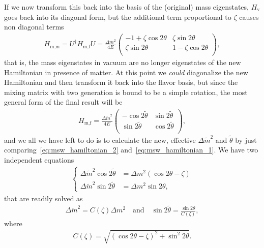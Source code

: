 If we now transform this back into the basis of the (original) mass eigenstates,
$H_\text{v}$ goes back into its diagonal form, but the additional term proportional
to $\zeta$ causes non diagonal terms
\begin{align*}
  H_\text{m,m} = U^\dag H_\text{m,f} U =
  \frac{\Delta m^2}{4E}
  \begin{pmatrix}
    -1  + \zeta \cos2\theta & \zeta \sin2\theta\\
    \zeta \sin2\theta & 1 - \zeta \cos2\theta\\
  \end{pmatrix},
\end{align*}
that is, the mass eigenstates in vacuum are no longer eigenstates of the new Hamiltonian
in presence of matter. At this point we \emph{could} diagonalize the new Hamiltonian
and then transform it back into the flavor basis, but since the mixing matrix with
two generation is bound to be a simple rotation, the most general form of the final
result will be
\begin{align}\label{eq:msw_hamiltonian_2}
  H_\text{m,f} = \frac{\Delta \tilde{m}^2}{4E}
  \begin{pmatrix}
   -\cos 2\tilde{\theta} & \sin 2\tilde{\theta}\\
   \sin 2\tilde{\theta} & \cos 2\tilde{\theta}\\
  \end{pmatrix},
\end{align}
and we all we have left to do is to calculate the new, effective $\Delta \tilde{m}^2$
and $\tilde{\theta}$ by just comparing~\eqref{eq:msw_hamiltonian_2} and~\eqref{eq:msw_hamiltonian_1}.
We have two independent equations
\begin{align*}
  \begin{cases}
    \Delta \tilde{m}^2 \cos 2\tilde{\theta} & = \Delta m^2 (\cos 2\theta - \zeta)\\
    \Delta \tilde{m}^2 \sin 2\tilde{\theta} & = \Delta m^2 \sin 2\theta,
  \end{cases}
\end{align*}
that are readily solved as
\begin{align}\label{eq:matter_deltam_theta}
  \Delta \tilde{m}^2 = C(\zeta) \Delta m^2
  \quad\text{and}\quad
  \sin 2\tilde{\theta} = \frac{\sin 2\theta}{C(\zeta)},
\end{align}
where
\begin{align}
  C(\zeta) = \sqrt{(\cos 2\theta - \zeta)^2 + \sin^2 2\theta}.
\end{align}


